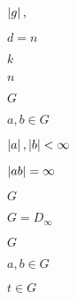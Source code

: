 \documentclass[10pt]{book}
\begin{document}
\begin{mdSnippets}
\begin{mdInlineSnippet}%
$\left\vert g\right\vert,$\end{mdInlineSnippet}%
\begin{mdInlineSnippet}[9f0fe099933e9457f8b8ff199b58d5e3]%
$d = n$\end{mdInlineSnippet}%
\begin{mdInlineSnippet}[8ce4b16b22b58894aa86c421e8759df3]%
$k$\end{mdInlineSnippet}%
\begin{mdInlineSnippet}[7b8b965ad4bca0e41ab51de7b31363a1]%
$n$\end{mdInlineSnippet}%
\begin{mdInlineSnippet}[dfcf28d0734569a6a693bc8194de62bf]%
$G$\end{mdInlineSnippet}%
\begin{mdInlineSnippet}[d5a2e0c347aea059ac0ec41b3e0e72b1]%
$a,b \in G$\end{mdInlineSnippet}%
\begin{mdInlineSnippet}[d7e434274f320b2c32e5d26d2caeba0f]%
$\left\vert a\right\vert, \left\vert b\right\vert < \infty$\end{mdInlineSnippet}%
\begin{mdInlineSnippet}[9960ce2ca91e2ec42c3627c98b723188]%
$\left\vert ab\right\vert = \infty$\end{mdInlineSnippet}%
\begin{mdInlineSnippet}[dfcf28d0734569a6a693bc8194de62bf]%
$G$\end{mdInlineSnippet}%
\begin{mdInlineSnippet}[4a56485892ef658c2ca165779ec3d7f1]%
$G = D_\infty$\end{mdInlineSnippet}%
\begin{mdInlineSnippet}[dfcf28d0734569a6a693bc8194de62bf]%
$G$\end{mdInlineSnippet}%
\begin{mdInlineSnippet}[d5a2e0c347aea059ac0ec41b3e0e72b1]%
$a,b \in G$\end{mdInlineSnippet}%
\begin{mdInlineSnippet}[4177438376534a4b527d000ff8548597]%
$t \in G$\end{mdInlineSnippet}%

\end{mdSnippets}
\end{document}
